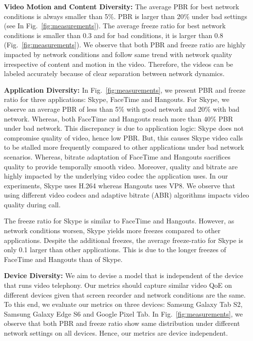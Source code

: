 \noindent \textbf{Video Motion and Content Diversity:} 
The average PBR for best network conditions is always smaller than 5\%. PBR is larger than 20\% under bad settings (see In Fig.~\ref{fig:measurements}). 
The average freeze ratio for best network conditions is smaller than 0.3 and for bad conditions, it is larger than 0.8 (Fig.~\ref{fig:measurements}). 
We observe that both PBR and freeze ratio are highly impacted by network conditions and follow same trend with network quality irrespective of content and motion in the video.
Therefore, the videos can be labeled accurately because of clear separation between network dynamics.

\noindent \textbf{Application Diversity:} 
In Fig.~\ref{fig:measurements}, we present PBR and freeze ratio for three applications: Skype, FaceTime and Hangouts.
For Skype, we observe an average PBR of less than 5\% with good network and 20\% with bad network. 
Whereas, both FaceTime and Hangouts reach more than 40\% PBR under bad network. 
This discrepancy is due to application logic: Skype does not compromise quality of video, hence low PBR. But, this causes Skype video calls to be stalled more frequently compared to other applications under bad network scenarios. Whereas,  bitrate adaptation of FaceTime and Hangouts sacrifices quality to provide temporally smooth video. 
Moreover, quality and bitrate are highly impacted by the underlying video codec the application uses. In our experiments, Skype uses H.264 whereas Hangouts uses VP8. We observe that using different video codecs and adaptive bitrate (ABR) algorithms impacts video quality during call.

The freeze ratio for Skype is similar to FaceTime and Hangouts. However, as network conditions worsen, Skype yields more freezes compared to other applications. Despite the additional freezes, the average freeze-ratio for Skype is only 0.1 larger than other applications. This is due to the longer freezes of FaceTime and Hangouts than of Skype.

\noindent \textbf{Device Diversity:} We aim to devise a model that is independent of the device that runs video telephony. Our metrics should capture similar video QoE on different devices given that screen recorder and network conditions are the same. To this end, we evaluate our metrics on three devices: Samsung Galaxy Tab S2, Samsung Galaxy Edge S6 and Google Pixel Tab. 
In Fig.~\ref{fig:measurements}, we observe that both PBR and freeze ratio show same distribution under different network settings on all devices. Hence, our metrics are device independent.
